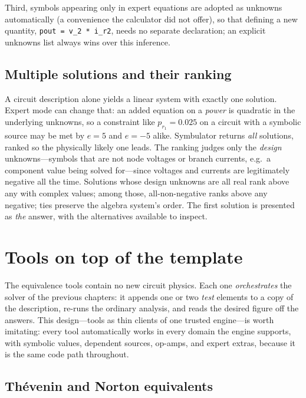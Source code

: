 \documentclass[11pt,oneside]{report}
\newcommand{\code}[1]{\texttt{#1}}
\begin{document}
Third, symbols appearing only in expert equations are adopted as
unknowns automatically (a convenience the calculator did not offer),
so that defining a new quantity, \code{pout = v\_2 * i\_r2}, needs no
separate declaration; an explicit unknowns list always wins over this
inference.

\section{Multiple solutions and their ranking}
\label{sec:multiple}

A circuit description alone yields a linear system with exactly one
solution. Expert mode can change that: an added equation on a
\emph{power} is quadratic in the underlying unknowns, so a constraint
like $p_{r_1} = 0.025$ on a circuit with a symbolic source may be met
by $e = 5$ and $e = -5$ alike. Symbulator returns \emph{all}
solutions, ranked so the physically likely one leads. The ranking
judges only the \emph{design} unknowns---symbols that are not node
voltages or branch currents, e.g.\ a component value being solved
for---since voltages and currents are legitimately negative all the
time. Solutions whose design unknowns are all real rank above any with
complex values; among those, all-non-negative ranks above any
negative; ties preserve the algebra system's order. The first solution
is presented as \emph{the} answer, with the alternatives available to
inspect.

\chapter{Tools on top of the template}
\label{ch:tools}

The equivalence tools contain no new circuit physics. Each one
\emph{orchestrates} the solver of the previous chapters: it appends
one or two \emph{test} elements to a copy of the description, re-runs
the ordinary analysis, and reads the desired figure off the answers.
This design---tools as thin clients of one trusted engine---is worth
imitating: every tool automatically works in every domain the engine
supports, with symbolic values, dependent sources, op-amps, and expert
extras, because it is the same code path throughout.

\section{Th\'evenin and Norton equivalents}
\label{sec:th}
\end{document}
